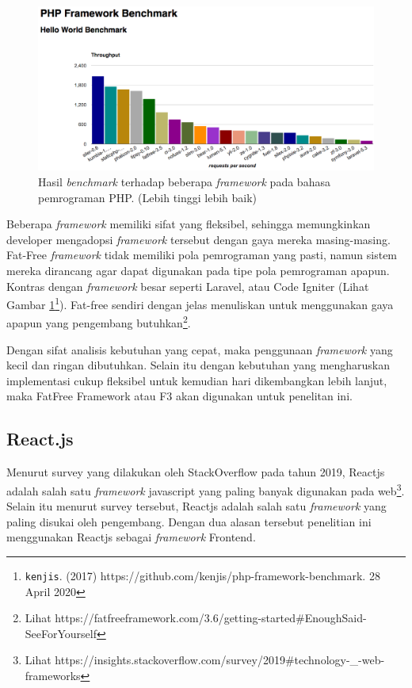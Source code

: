 \begin{figure}[]
    \centering
    \includegraphics[width=0.6\paperwidth]{Gambar/php-framework-benchmark-20170214.png}
    \caption{Hasil \textit{benchmark} terhadap beberapa \textit{framework} pada
        bahasa pemrograman PHP. (Lebih
        tinggi lebih baik)}
    \label{fig:chart-benchmark-php-framework}
\end{figure}

Beberapa \textit{framework} memiliki sifat yang fleksibel, sehingga memungkinkan
developer mengadopsi \textit{framework} tersebut dengan gaya mereka masing-masing.
Fat-Free \textit{framework} tidak memiliki pola pemrograman yang pasti, namun sistem
mereka dirancang agar dapat digunakan pada tipe pola pemrograman apapun. Kontras
dengan \textit{framework} besar seperti Laravel, atau Code Igniter (Lihat Gambar
\ref{fig:chart-benchmark-php-framework}\footnote{\texttt{kenjis}. (2017)
https://github.com/kenjis/php-framework-benchmark. 28 April 2020}). Fat-free sendiri
dengan jelas menuliskan untuk menggunakan gaya apapun yang pengembang
butuhkan\footnote{Lihat https://fatfreeframework.com/3.6/getting-started\#EnoughSaid-SeeForYourself}.
 
Dengan sifat analisis kebutuhan yang cepat, maka penggunaan \textit{framework} yang kecil
dan ringan dibutuhkan. Selain itu dengan kebutuhan yang mengharuskan
implementasi cukup fleksibel untuk kemudian hari dikembangkan lebih lanjut, maka
FatFree Framework atau F3 akan digunakan untuk penelitan ini.

\subsection{React.js}
    Menurut survey yang dilakukan oleh StackOverflow pada tahun 2019, Reactjs
    adalah salah satu \textit{framework} javascript yang paling banyak digunakan
    pada
    web\footnote{Lihat https://insights.stackoverflow.com/survey/2019{\#}technology-{\_}-web-frameworks}.
    Selain itu menurut survey tersebut, Reactjs adalah salah satu \textit{framework} yang
    paling disukai oleh pengembang. Dengan dua alasan tersebut penelitian ini
    menggunakan Reactjs sebagai \textit{framework} Frontend.

